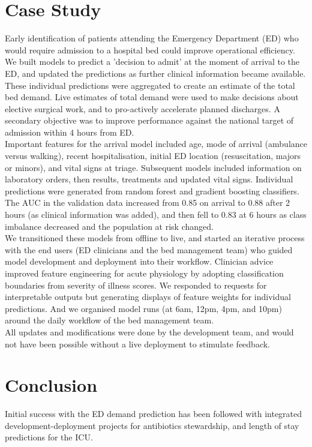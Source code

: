 \documentclass[pmlr,twocolumn,10pt]{jmlr} %
\begin{document}
\section{Case Study}
Early identification of patients attending the Emergency Department (ED) who would require admission to a hospital bed could improve operational efficiency. We built models to predict a 'decision to admit' at the moment of arrival to the ED, and updated the predictions as further clinical information became available. These individual predictions were aggregated to create an estimate of the total bed demand. Live estimates of total demand were used to make decisions about elective surgical work, and to pro-actively accelerate planned discharges. 
A secondary objective was to improve performance against the national target of admission within 4 hours from ED.\citep{kings2021} \\
Important features for the arrival model included age, mode of arrival (ambulance versus walking), recent hospitalisation, initial ED location (resuscitation, majors or minors), and vital signs at triage. Subsequent models included information on laboratory orders, then results, treatments and updated vital signs. Individual predictions were generated from random forest and gradient boosting classifiers. The AUC in the validation data increased from 0.85 on arrival to 0.88 after 2 hours (as clinical information was added), and then fell to 0.83 at 6 hours as class imbalance decreased and the population at risk changed.\\
We transitioned these models from offline to live, and started an iterative process with the end users (ED clinicians and the bed management team) who guided model development and deployment into their workflow. Clinician advice improved feature engineering for acute physiology by adopting classification boundaries from severity of illness scores. We responded to requests for interpretable outputs but generating displays of feature weights for individual predictions. And we organised model runs (at 6am, 12pm, 4pm, and 10pm) around the daily workflow of the bed management team.\\
All updates and modifications were done by the development team, and would not have been possible without a live deployment to stimulate feedback.  

\section{Conclusion}
Initial success with the ED demand prediction has been followed with integrated development-deployment projects for antibiotics stewardship, and length of stay predictions for the ICU. 
\end{document}
